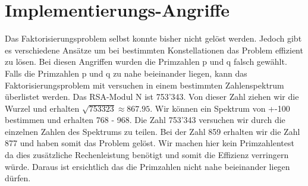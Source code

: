 \section{Implementierungs-Angriffe}
Das Faktorisierungsproblem selbst konnte bisher nicht gelöst werden. Jedoch gibt es verschiedene Ansätze um bei bestimmten Konstellationen das Problem effizient zu lösen. 
Bei diesen Angriffen wurden die Primzahlen p und q falsch gewählt.
Falls die Primzahlen p und q zu nahe beieinander liegen, kann das Faktorisierungsproblem mit versuchen in einem bestimmten Zahlenspektrum überlistet werden. Das RSA-Modul N ist 753'343. Von dieser Zahl ziehen wir die Wurzel und erhalten $ \sqrt{753323} \approx 867.95 $. Wir können  ein Spektrum von +-100 bestimmen und erhalten 768 - 968. Die Zahl 753'343 versuchen wir durch die einzelnen Zahlen des Spektrums zu teilen. Bei der Zahl 859 erhalten wir die Zahl 877 und haben somit das Problem gelöst. Wir machen hier kein Primzahlentest da dies zusätzliche Rechenleistung benötigt und somit die Effizienz verringern würde. Daraus ist ersichtlich das die Primzahlen nicht nahe beieinander liegen dürfen.%

